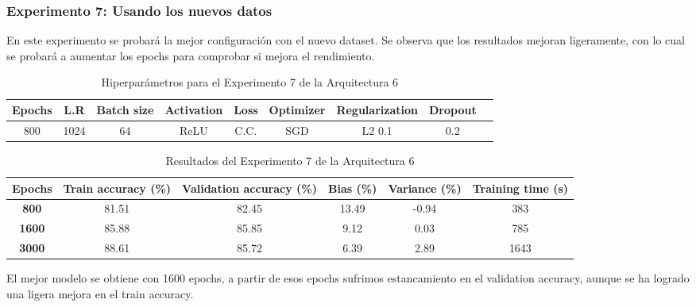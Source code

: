 \documentclass{article}
\begin{document}
    \subsubsection{Experimento 7: Usando los nuevos datos}

En este experimento se probar\'a la mejor configuraci\'on con el nuevo dataset. Se observa que los resultados mejoran ligeramente, con lo cual se probar\'a a aumentar los epochs para comprobar si mejora el rendimiento. 

     \begin{table}[!h]
				\begin{tabular}{|c|c|c|c|c|c|c|c|c|}
					\textbf{Epochs}&\textbf{L.R}&\textbf{Batch size}&\textbf{Activation}&\textbf{Loss}&\textbf{Optimizer}&\textbf{Regularization}&\textbf{Dropout}   \\ \hline
					800 & 1024  & 64 & ReLU & C.C. & SGD & L2 0.1 & 0.2 
				\end{tabular}
				\caption{Hiperpar\'ametros para el Experimento 7 de la Arquitectura 6}
				\label{tab:hip-a6-e2}
			\end{table}
    
   
   \begin{table}[!h]
				\begin{center}
					\begin{tabular}{ c | c | c | c | c | c |}
						 \textbf{Epochs} & \textbf{Train accuracy (\%)} & \textbf{Validation accuracy (\%)} & \textbf{Bias (\%)} & \textbf{Variance (\%)} & \textbf{Training time (s)} \\ \hline
                        \textbf{800} & 81.51   & 82.45 & 13.49 & -0.94  &   383   \\ \hline
                        \textbf{1600} & 85.88   & 85.85 & 9.12 & 0.03  &  785    \\ \hline
                        \textbf{3000} & 88.61   & 85.72  & 6.39 & 2.89  &  1643     \\ \hline
                       
					\end{tabular}
					\caption{Resultados del Experimento 7 de la Arquitectura 6}
					\label{tab:res-a2-e5}
				\end{center}
			\end{table}

   El mejor modelo se obtiene con 1600 epochs, a partir de esos epochs sufrimos estancamiento en el validation accuracy, aunque se ha logrado una ligera mejora en el train accuracy. 	
   
\end{document}
